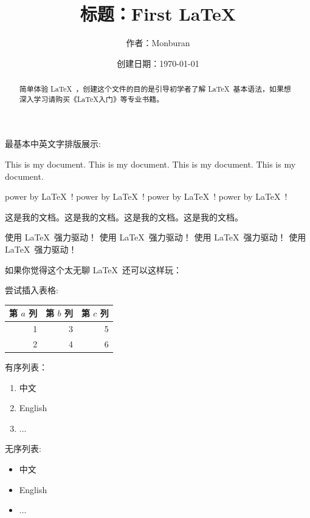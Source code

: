 \documentclass[UTF8]{ctexart} %
\title{标题：First LaTeX}
\author{作者：Monburan}
\date{创建日期：\today}
\begin{document}
\maketitle

\begin{abstract}
简单体验 \LaTeX\ ，创建这个文件的目的是引导初学者了解 \LaTeX\ 基本语法，如果想深入学习请购买《LaTeX入门》等专业书籍。
\end{abstract}
\noindent
最基本中英文字排版展示:

This is my document. This is my document. This is my document. This is my document.

power by \LaTeX\ ! power by \LaTeX\ ! power by \LaTeX\ ! power by \LaTeX\ !

这是我的文档。这是我的文档。这是我的文档。这是我的文档。

使用 \LaTeX\ 强力驱动！ 使用 \LaTeX\ 强力驱动！ 使用 \LaTeX\ 强力驱动！ 使用 \LaTeX\ 强力驱动！

\noindent
如果你觉得这个太无聊 \LaTeX\ 还可以这样玩：


\noindent
尝试插入表格:

\noindent %
\begin{tabular}{|rrr|}

\hline
第 $a$ 列 & 第 $b$ 列 & 第 $c$ 列 \\
\hline
1 & 3 & 5 \\
2 & 4 & 6 \\
\hline
\end{tabular}

有序列表：

\begin{enumerate}
 \item 中文
 \item English
 \item ...
\end{enumerate}

无序列表:

\begin{itemize}
 \item 中文
 \item English
 \item ...
\end{itemize}
\end{document}
